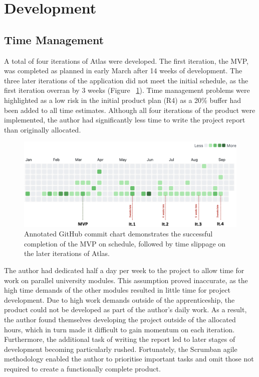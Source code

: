 \documentclass{article}
\begin{document}
\newpage
\section{Development}
\subsection{Time Management}

A total of four iterations of Atlas were developed. The first iteration, the MVP, was completed as planned in early March after 14 weeks of development. The three later iterations of the application did not meet the initial schedule, as the first iteration overran by 3 weeks (Figure ~\ref{fig:github}). Time management problems were highlighted as a low risk in the initial product plan (R4) as a 20\% buffer had been added to all time estimates. Although all four iterations of the product were implemented, the author had significantly less time to write the project report than originally allocated.

\begin{figure}[!htb]
  \centering
      \includegraphics[width=1\textwidth]{images/timeline.png}
  \caption{Annotated GitHub commit chart demonstrates the successful completion of the MVP on schedule, followed by time slippage on the later iterations of Atlas.}
  \label{fig:github}
\end{figure}

The author had dedicated half a day per week to the project to allow time for work on parallel university modules. This assumption proved inaccurate, as the high time demands of the other modules resulted in little time for project development. Due to high work demands outside of the apprenticeship, the product could not be developed as part of the author's daily work. As a result, the author found themselves developing the project outside of the allocated hours, which in turn made it difficult to gain momentum on each iteration. Furthermore, the additional task of writing the report led to later stages of development becoming particularly rushed. Fortunately, the Scrumban agile methodology enabled the author to prioritise important tasks and omit those not required to create a functionally complete product.
\end{document}
